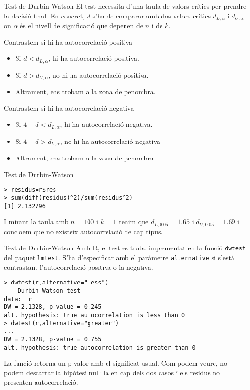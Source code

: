 \documentclass[12pt,t]{beamer}
\theoremstyle{plain}
\theoremstyle{definition}
\begin{document}
\begin{frame}{Test de Durbin-Watson}
El test necessita d'una taula de valors crítics per prendre la decisió final. En concret, $d$ s'ha de comparar amb dos valors crítics $d_{L,\alpha}$ i $d_{U,\alpha}$ on $\alpha$ és el nivell de significació que depenen de $n$ i de $k$.

\vspace{0.25cm}
Contrastem si hi ha autocorrelació positiva
\begin{itemize}
\item Si $d<d_{L,\alpha}$, hi ha autocorrelació positiva.
\item Si $d>d_{U,\alpha}$, no hi ha autocorrelació positiva.
\item Altrament, ens trobam a la zona de penombra.
\end{itemize}

\vspace{0.25cm}
Contrastem si hi ha autocorrelació negativa
\begin{itemize}
\item Si $4-d<d_{L,\alpha}$, hi ha autocorrelació negativa.
\item Si $4-d>d_{U,\alpha}$, no hi ha autocorrelació negativa.
\item Altrament, ens trobam a la zona de penombra.
\end{itemize}

\end{frame}

\begin{frame}[fragile]{Test de Durbin-Watson}
\begin{verbatim}
> residus=r$res
> sum(diff(residus)^2)/sum(residus^2)
[1] 2.132796
\end{verbatim}
I mirant la taula amb $n=100$ i $k=1$ tenim que $d_{L,0.05}=1.65$ i $d_{U,0.05}=1.69$ i concloem que no existeix autocorrelació de cap tipus.
\end{frame}

\begin{frame}[fragile]{Test de Durbin-Watson}
Amb R, el test es troba implementat en la funció \texttt{dwtest} del paquet \texttt{lmtest}. S'ha d'especificar amb el paràmetre \texttt{alternative} si s'està contrastant l'autocorrelació positiva o la negativa.
\begin{footnotesize}
\begin{verbatim}
> dwtest(r,alternative="less")
	Durbin-Watson test
data:  r
DW = 2.1328, p-value = 0.245
alt. hypothesis: true autocorrelation is less than 0
> dwtest(r,alternative="greater")
...
DW = 2.1328, p-value = 0.755
alt. hypothesis: true autocorrelation is greater than 0
\end{verbatim}
\end{footnotesize}
La funció retorna un p-valor amb el significat usual. Com podem veure, no podem descartar la hipòtesi nul·la en cap dels dos casos i els residus no presenten autocorrelació.
\end{frame}
\end{document}
